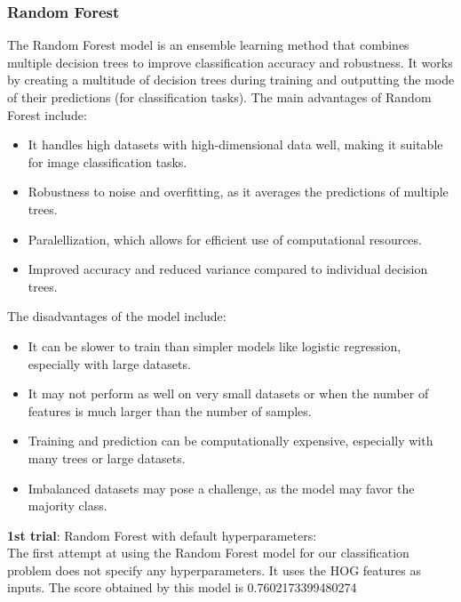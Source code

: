 \documentclass{article}
\begin{document}
\subsubsection{Random Forest}
The Random Forest model is an ensemble learning method that combines multiple decision trees to improve classification accuracy and robustness. It works by creating a multitude of decision trees during training and outputting the mode of their predictions (for classification tasks). 
The main advantages of Random Forest include:
\begin{itemize}
    \item It handles high datasets with high-dimensional data well, making it suitable for image classification tasks.
    \item Robustness to noise and overfitting, as it averages the predictions of multiple trees.
    \item Paralellization, which allows for efficient use of computational resources.
    \item Improved accuracy and reduced variance compared to individual decision trees.
\end{itemize}
The disadvantages of the model include:
\begin{itemize}
    \item It can be slower to train than simpler models like logistic regression, especially with large datasets.
    \item It may not perform as well on very small datasets or when the number of features is much larger than the number of samples.
    \item Training and prediction can be computationally expensive, especially with many trees or large datasets.
    \item Imbalanced datasets may pose a challenge, as the model may favor the majority class.
\end{itemize}
\textbf{1st trial}: Random Forest with default hyperparameters:\\
The first attempt at using the Random Forest model for our classification problem does not specify any hyperparameters. It uses the HOG features as inputs. The score obtained by this model is 0.7602173399480274
\end{document}
